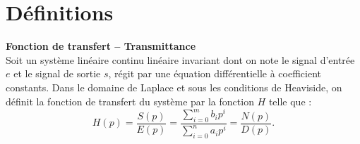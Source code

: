 \fichetrue
\proftrue
\tdfalse
\coursfalse

\def\xxnumchapitre{Chapitre 2 \vspace{.2cm}}
\def\xxchapitre{\hspace{.12cm} Modélisation par fonction de transfert et schéma-blocs}
\def\xxYCartouche{-2.25cm}
\def\xxposongletx{2}
\def\xxposonglettext{1.45}
\def\xxposonglety{19}%

\def\xxonglet{Cy 01 -- Ch 2}

\def\xxactivite{Fiche}


\def\xxpied{%
Cycle 01 -- Modéliser le comportement des systèmes multiphysiques\\
Ch 2 -- \xxactivite%
}

\setcounter{secnumdepth}{5}

\iflivret

\else

\fi
\vspace{.5cm}
\pagestyle{fancy}
\thispagestyle{plain}
\setcounter{section}{0}



\section{Définitions}


\begin{defi} \textbf{\textsf{Fonction de transfert -- Transmittance}} ~\\
Soit un système linéaire continu linéaire invariant dont on note le signal d'entrée $e$ et le signal de sortie $s$, régit par une équation différentielle à coefficient constants. Dans le domaine de Laplace et sous les conditions de Heaviside, on définit la fonction de transfert du système par la fonction $H$ telle que : 
$$
H(p)
=\dfrac{S(p)}{E(p)} 
= \dfrac{\sum\limits_{i=0}^{m} b_i p^i}{\sum\limits_{i=0}^{n} a_i p^i}
=\dfrac{N(p)}{D(p)}.
$$
 

\end{defi}

